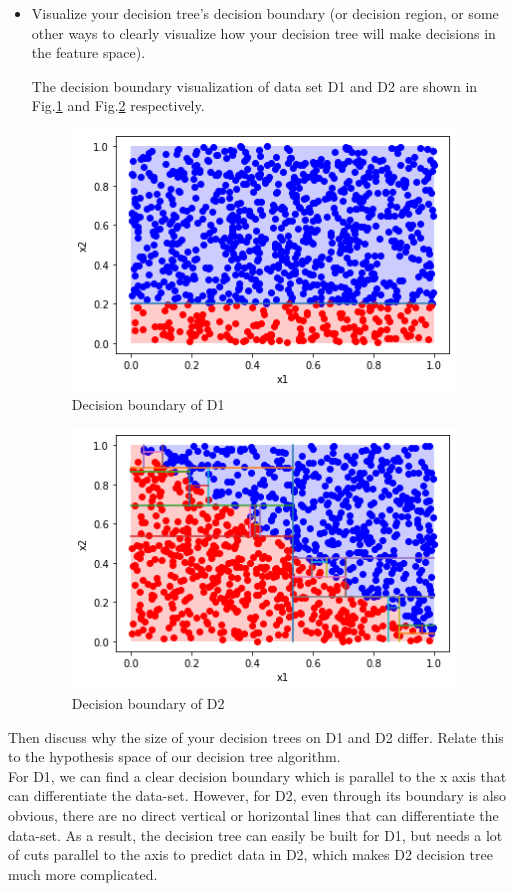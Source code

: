 \documentclass[a4paper]{article}
\theoremstyle{definition}
\begin{document}
\begin{enumerate}
\begin{itemize}
  \item Visualize your decision tree's decision boundary (or decision region, or some other ways to clearly visualize how your decision tree will make decisions in the feature space).

{\color{blue}
The decision boundary visualization of data set D1 and D2 are shown in Fig.\ref{Q6-3} and Fig.\ref{Q6-4} respectively.
}

\begin{figure}[htbp]
\centering
\includegraphics[width=4in]{Q6-3.png}
\caption{Decision boundary of D1}
\label{Q6-3}
\end{figure}

\begin{figure}[htbp]
\centering
\includegraphics[width=4in]{Q6-4.png}
\caption{Decision boundary of D2}
\label{Q6-4}
\end{figure}

  \end{itemize}
Then discuss why the size of your decision trees on D1 and D2 differ.  Relate this to the hypothesis space of our decision tree algorithm. \\
{\color{blue}
For D1, we can find a clear decision boundary which is parallel to the x axis that can differentiate the data-set. However, for D2, even through its boundary is also obvious, there are no direct vertical or horizontal lines that can differentiate the data-set. As a result, the decision tree can easily be built for D1, but needs a lot of cuts parallel to the axis to predict data in D2, which makes D2 decision tree much more complicated.}


\end{enumerate}
\end{document}

